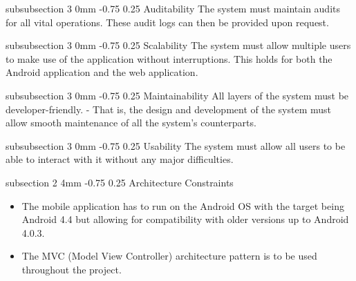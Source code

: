 \documentclass[12pt]{article}
\makeatletter
\renewcommand{\subsection}{\@startsection
   {subsection}%
   {2}%
   {4mm}%
   {-0.75\baselineskip}%
   {0.25\baselineskip}%
   {\rmfamily\normalfont\scshape\normalsize}}%
\renewcommand{\subsubsection}{\@startsection
   {subsubsection}%
   {3}%
   {0mm}%
   {-0.75\baselineskip}%
   {0.25\baselineskip}%
   {\rmfamily\normalfont\slshape\normalsize}}%
\makeatother
\begin{document}
                				\subsubsection{Auditability}
		   			                   	The system must maintain audits for all vital operations. These audit logs can then be provided upon request. 
		   			            		
                				\subsubsection{Scalability}
	   			                   		The system must allow multiple users to make use of the application without interruptions. This holds for both the Android application and the web application.
		       			                  	
               					\subsubsection{Maintainability}
					                  	All layers of the system must be developer-friendly. - That is, the design and development of the system must allow smooth maintenance of all the system's counterparts.
       						    
       						    \subsubsection{Usability}
			    	                  	The system must allow all users to be able to interact with it without any major difficulties.
       						    	                  	
                
                		\subsection{Architecture Constraints}
                				
                				\begin{itemize}
                						\item The mobile application has to run on the Android OS with the target being Android 4.4 but allowing for compatibility with older versions up to Android 4.0.3. 
                						\item The MVC (Model View Controller) architecture pattern is to be used throughout the project.
                				\end{itemize}
               
\end{document}
